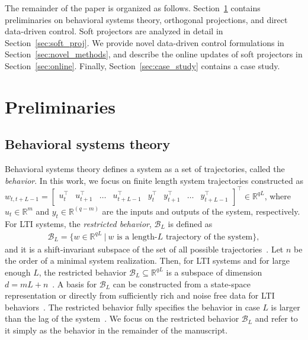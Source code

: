 \documentclass[letterpaper, 10 pt, conference]{ieeeconf}
\begin{document}
The remainder of the paper is organized as follows.
Section~\ref{sec:prelim} contains preliminaries on behavioral systems theory, orthogonal projections, and direct data-driven control. 
Soft projectors are analyzed in detail in Section~\ref{sec:soft_proj}.
We provide novel data-driven control formulations in Section~\ref{sec:novel_methods}, and describe the online updates of soft projectors in Section~\ref{sec:online}. Finally, Section~\ref{sec:case_study} contains a case study.


\section{Preliminaries} \label{sec:prelim}
\subsection{Behavioral systems theory} \label{sec:prelim_control}
Behavioral systems theory defines a system as a set of trajectories, called the \textit{behavior}.
In this work, we focus on finite length system trajectories constructed as $w_{t,t+L-1}=\begin{bmatrix}
    u_t^\top & u_{t+1}^\top & \dots & u_{t+L-1}^\top & y_t^\top & y_{t+1}^\top & \dots& y_{t+L-1}^\top
\end{bmatrix}^\top \in \mathbb{R}^{qL}$,
where $u_t\in\mathbb{R}^m$ and $y_t\in\mathbb{R}^{(q-m)}$ are the inputs and outputs of the system, respectively.
For \gls{LTI} systems, the \textit{restricted behavior}, $\mathcal{B}_L$ is defined as
\begin{align*}
    \mathcal{B}_L = \{w\in \mathbb{R}^{qL}~|~w \text{ is a length-$L$ trajectory of the system}\},
\end{align*}
and it is a shift-invariant subspace of the set of all possible trajectories~\cite{markovsky2022data}.
Let $n$ be the order of a minimal system realization.
Then, for \gls{LTI} systems and for large enough $L$, the restricted behavior $\mathcal{B}_L \subseteq \mathbb{R}^{qL}$ is a subspace of dimension $d = mL + n$~\cite{willems1997introduction}.
A basis for $\mathcal{B}_L$ can be constructed from a state-space representation or directly from sufficiently rich and noise free data for \gls{LTI} behaviors~\cite{markovsky2022data, willems2005note}.
The restricted behavior fully specifies the behavior in case $L$ is larger than the lag of the system~\cite{willems1997introduction}.
We focus on the restricted behavior $\mathcal{B}_L$ and refer to it simply as the behavior in the remainder of the manuscript.
\end{document}
